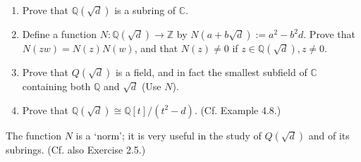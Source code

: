 \documentclass[a4paper, pdf, 12pt]{article}
\begin{document}
\begin{enumerate}
  \item Prove that $\mathbb{Q}(\sqrt{d})$ is a subring of $\mathbb{C}$.
  \item Deﬁne a function $N : \mathbb{Q} (\sqrt{d}) \rightarrow \mathbb{Z}$ by $N(a + b\sqrt{d}) := a^2-b^2d$.
Prove that
    $N(zw) = N(z)N(w)$, and that $N(z) \neq 0$ if $z \in \mathbb{Q}(\sqrt{d}), z \neq 0.$

  \item Prove that $Q (\sqrt{d})$ is a ﬁeld, and in fact the smallest subﬁeld of $\mathbb{C}$ containing
  both $\mathbb{Q}$ and $\sqrt{d}$ (Use $N$).

  \item Prove that $\mathbb{Q}(\sqrt{d}) \cong \mathbb{Q}[t]/(t^2-d)$. (Cf. Example 4.8.)
\end{enumerate}
The function $N$ is a ‘norm’; it is very useful in the study of $Q (\sqrt{d})$ and of its subrings. (Cf. also Exercise 2.5.)
\end{document}
